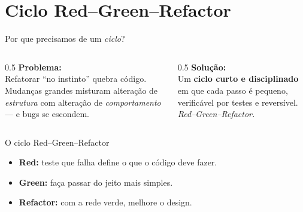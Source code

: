 \documentclass[aspectratio=169]{beamer}
\begin{document}
\section{Ciclo Red--Green--Refactor}

\begin{frame}{Por que precisamos de um \emph{ciclo}?}
  \begin{columns}[T]
    \begin{column}{0.5\textwidth}
      \textbf{Problema:}\\[0.4em]
      Refatorar ``no instinto'' quebra código.
      Mudanças grandes misturam alteração de
      \emph{estrutura} com alteração de
      \emph{comportamento} --- e bugs se escondem.
    \end{column}
    \begin{column}{0.5\textwidth}
      \textbf{Solução:}\\[0.4em]
      Um \textbf{ciclo curto e disciplinado} em que
      cada passo é pequeno, verificável por testes e
      reversível. \emph{Red--Green--Refactor.}
    \end{column}
  \end{columns}
\end{frame}

\begin{frame}[shrink=5]{O ciclo Red--Green--Refactor}
  \begin{center}
  \end{center}
  \begin{itemize}\footnotesize
    \item \textbf{Red:} teste que falha define o que o código deve fazer.
    \item \textbf{Green:} faça passar do jeito mais simples.
    \item \textbf{Refactor:} com a rede verde, melhore o design.
  \end{itemize}
\end{frame}
\end{document}
